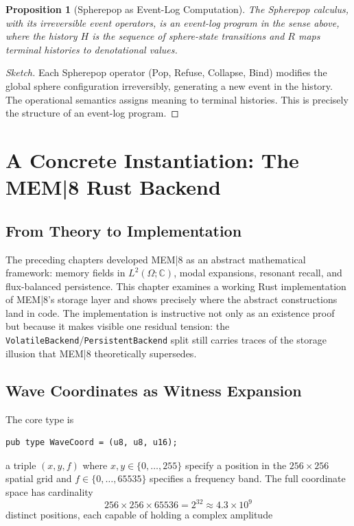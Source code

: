 \documentclass[12pt, oneside]{book}
\theoremstyle{plain}
\newtheorem{proposition}[theorem]{Proposition}
\theoremstyle{definition}
\theoremstyle{remark}
\newcommand{\CC}{\mathbb{C}}
\begin{document}
\begin{proposition}[Spherepop as Event-Log Computation]
The Spherepop calculus, with its irreversible event
operators, is an event-log program in the sense above,
where the history $H$ is the sequence of sphere-state
transitions and $R$ maps terminal histories to
denotational values.
\end{proposition}

\begin{proof}[Sketch]
Each Spherepop operator (Pop, Refuse, Collapse, Bind)
modifies the global sphere configuration irreversibly,
generating a new event in the history.
The operational semantics assigns meaning to terminal
histories.
This is precisely the structure of an event-log program.
\end{proof}

\chapter{A Concrete Instantiation: The MEM|8 Rust Backend}
\label{ch:rust}

\section{From Theory to Implementation}

The preceding chapters developed MEM|8 as an abstract mathematical
framework: memory fields in $L^2(\Omega;\CC)$, modal expansions,
resonant recall, and flux-balanced persistence.
This chapter examines a working Rust implementation of MEM|8's
storage layer \cite{Chenoweth2025MEM8} and shows precisely where the abstract constructions
land in code.
The implementation is instructive not only as an existence proof
but because it makes visible one residual tension: the
\texttt{VolatileBackend}/\texttt{PersistentBackend} split still
carries traces of the storage illusion that MEM|8 theoretically
supersedes.

\section{Wave Coordinates as Witness Expansion}

The core type is

\begin{verbatim}
pub type WaveCoord = (u8, u8, u16);
\end{verbatim}

\noindent
a triple $(x, y, f)$ where $x, y \in \{0,\ldots,255\}$ specify
a position in the $256 \times 256$ spatial grid and
$f \in \{0,\ldots,65535\}$ specifies a frequency band.
The full coordinate space has cardinality
\[
  256 \times 256 \times 65536 = 2^{32} \approx 4.3 \times 10^9
\]
distinct positions, each capable of holding a complex amplitude
\end{document}
